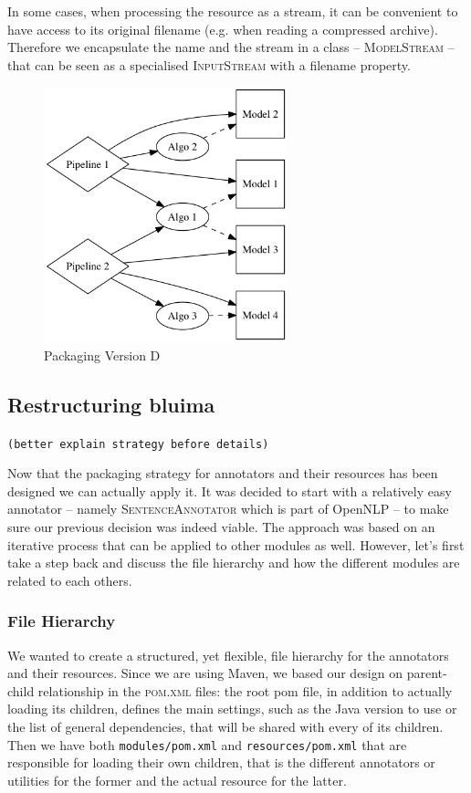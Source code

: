 \documentclass{article}
\newcommand{\id}[1]{\mbox{\textsc{#1}}}
\newcommand{\path}[1]{\mbox{\texttt{#1}}}
\newcommand{\TODO}[1]{\texttt{\textcolor{YellowOrange}{(#1)}}} %
\begin{document}
In some cases, when processing the resource as a stream, it can be convenient to have access to its original filename (e.g. when reading a compressed archive). Therefore we encapsulate the name and the stream in a class -- \id{ModelStream} -- that can be seen as a specialised \id{InputStream} with a filename property.

\begin{figure}
\centering
\includegraphics[width=200pt]{res/packaging_version_D.png}
\caption{Packaging Version D}
\label{fig:pkgsysD}
\end{figure}


\subsection{Restructuring bluima}
\label{sec:restructuring_bluima}

\TODO{better explain strategy before details}

Now that the packaging strategy for annotators and their resources has been designed we can actually apply it. It was decided to start with a relatively easy annotator -- namely \id{SentenceAnnotator} which is part of OpenNLP -- to make sure our previous decision was indeed viable. The approach was based on an iterative process that can be applied to other modules as well. However, let's first take a step back and discuss the file hierarchy and how the different modules are related to each others.

\subsubsection{File Hierarchy}

We wanted to create a structured, yet flexible, file hierarchy for the annotators and their resources. Since we are using Maven, we based our design on parent-child relationship in the \id{pom.xml} files: the root pom file, in addition to actually loading its children, defines the main settings, such as the Java version to use or the list of general dependencies, that will be shared with every of its children. Then we have both \path{modules/pom.xml} and \path{resources/pom.xml} that are responsible for loading their own children, that is the different annotators or utilities for the former and the actual resource for the latter.
\end{document}
